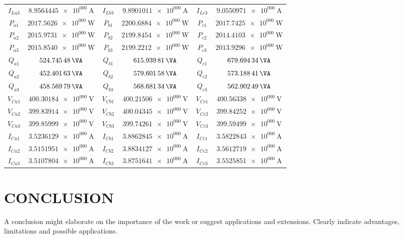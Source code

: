 \documentclass[a4paper,oneside,onecolumn,draftcls,12pt,conference]{IEEEtran}
\begin{document}
\begin{table}[ht]
\begin{minipage}[b]{0.45\textwidth}
{\begin{tabular}{cc|cc|cc}
 					$I_{La3}$&$\SI{8.9564445e+000}{\A}$&  $I_{Lb3}$&$\SI{9.8901011e+000}{\A}$& $I_{Lc3}$&$\SI{9.0550971e+000}{\A}$ \\
 					$P_{a1}$& $\SI{2017.5626e+000}{\W}$&  $P_{b1}$& $\SI{2200.6884e+000}{\W}$& $P_{c1}$& $\SI{2017.7425e+000}{\W}$ \\
 					$P_{a2}$& $\SI{2015.9731e+000}{\W}$&  $P_{b2}$& $\SI{2199.8454e+000}{\W}$& $P_{c2}$& $\SI{2014.4103e+000}{\W}$ \\
 					$P_{a3}$& $\SI{2015.8540e+000}{\W}$&  $P_{b3}$& $\SI{2199.2212e+000}{\W}$& $P_{c3}$& $\SI{2013.9296e+000}{\W}$ \\
 					$Q_{a1}$& $\SI{524.74548e+000}{\VA}$&  $Q_{b1}$& $\SI{615.93981e+000}{\VA}$& $Q_{c1}$& $\SI{679.69434e+000}{\VA}$ \\
 					$Q_{a2}$& $\SI{452.40163e+000}{\VA}$&  $Q_{b2}$& $\SI{579.60158e+000}{\VA}$& $Q_{c2}$& $\SI{573.18841e+000}{\VA}$ \\
 					$Q_{a3}$& $\SI{458.56979e+000}{\VA}$&  $Q_{b3}$& $\SI{568.68134e+000}{\VA}$& $Q_{c3}$& $\SI{562.90249e+000}{\VA}$ \\
 					$V_{Ca1}$&$\SI{400.30184e+000}{\V}$&  $V_{Cb1}$&$\SI{400.21506e+000}{\V}$& $V_{Cc1}$&$\SI{400.56338e+000}{\V}$ \\
 					$V_{Ca2}$&$\SI{399.83914e+000}{\V}$&  $V_{Cb2}$&$\SI{400.04345e+000}{\V}$& $V_{Cc2}$&$\SI{399.84252e+000}{\V}$ \\
 					$V_{Ca3}$&$\SI{399.85999e+000}{\V}$&  $V_{Cb3}$&$\SI{399.74261e+000}{\V}$& $V_{Cc3}$&$\SI{399.59499e+000}{\V}$ \\
 					$I_{Ca1}$&$\SI{3.5236129e+000}{\A}$&  $I_{Cb1}$&$\SI{3.8862845e+000}{\A}$& $I_{Cc1}$&$\SI{3.5822843e+000}{\A}$ \\
 					$I_{Ca2}$&$\SI{3.5151951e+000}{\A}$&  $I_{Cb2}$&$\SI{3.8834127e+000}{\A}$& $I_{Cc2}$&$\SI{3.5612719e+000}{\A}$ \\
 					$I_{Ca3}$&$\SI{3.5107804e+000}{\A}$&  $I_{Cb3}$&$\SI{3.8751641e+000}{\A}$& $I_{Cc3}$&$\SI{3.5525851e+000}{\A}$ \\
 					\bottomrule                                                                                          
 				\end{tabular}}
 			\end{minipage}
 		\end{table}
 		
 		
 		

\section{CONCLUSION}
A conclusion might elaborate on the importance of the work or suggest
applications and extensions. Clearly indicate advantages, limitations and
possible applications.
\end{document}
